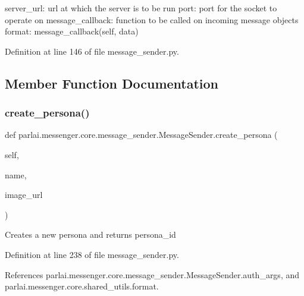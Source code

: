 \begin{DoxyVerb}server_url:           url at which the server is to be run
port:                 port for the socket to operate on
message_callback:     function to be called on incoming message objects
              format: message_callback(self, data)
\end{DoxyVerb}
 

Definition at line 146 of file message\+\_\+sender.\+py.



\subsection{Member Function Documentation}
\mbox{\label{classparlai_1_1messenger_1_1core_1_1message__sender_1_1MessageSender_afeadd94dbc8a34f974c799c1b0f7e71c}} 
\subsubsection{\texorpdfstring{create\+\_\+persona()}{create\_persona()}}
{\footnotesize\ttfamily def parlai.\+messenger.\+core.\+message\+\_\+sender.\+Message\+Sender.\+create\+\_\+persona (\begin{DoxyParamCaption}\item[{}]{self,  }\item[{}]{name,  }\item[{}]{image\+\_\+url }\end{DoxyParamCaption})}

\begin{DoxyVerb}Creates a new persona and returns persona_id\end{DoxyVerb}
 

Definition at line 238 of file message\+\_\+sender.\+py.



References parlai.\+messenger.\+core.\+message\+\_\+sender.\+Message\+Sender.\+auth\+\_\+args, and parlai.\+messenger.\+core.\+shared\+\_\+utils.\+format.

\mbox{\label{classparlai_1_1messenger_1_1core_1_1message__sender_1_1MessageSender_a1d7388a73e5e7d20f5174fef8b277f4d}} 
